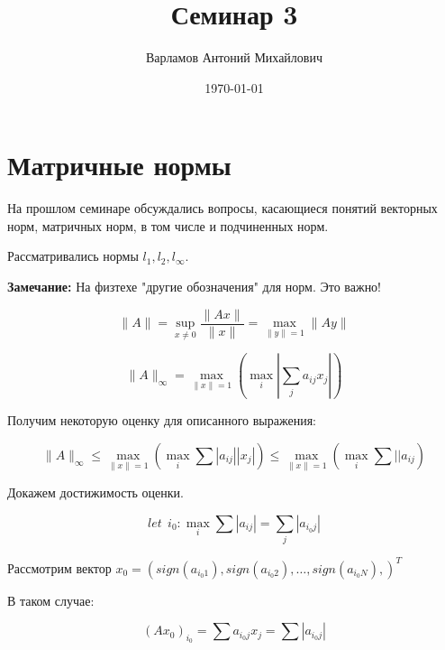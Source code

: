\documentclass[10pt,a4paper]{article}
\title{Семинар 3}
\date{\today}
\author{Варламов Антоний Михайлович}
\begin{document}
	\maketitle
	
	\section{Матричные нормы}
	
	На прошлом семинаре обсуждались вопросы, касающиеся понятий векторных норм, 
	матричных норм, в том числе и подчиненных норм.
	
	Рассматривались нормы $l_{1}, l_{2}, l_{\infty}$. 
	
	\textbf{Замечание:} На физтехе "другие обозначения" для норм. Это важно!
	
	\begin{equation}
		\parallel A \parallel = \sup\limits_{x \neq 0} 
		\frac{\parallel Ax \parallel}{\parallel x \parallel} = \max\limits_{
		\parallel y \parallel = 1} \parallel Ay \parallel
	\end{equation}
	
	\begin{equation}
		\parallel A \parallel_{\infty} = \max\limits_{\parallel x \parallel=  1}
		\left(\max\limits_{i}\left|\sum\limits_{j}a_{ij}x_{j}\right|\right)
	\end{equation}
	
	Получим некоторую оценку для описанного выражения:
	
	\begin{equation}
		\parallel A \parallel_{\infty} \leqslant \max\limits_{\parallel x 
		\parallel = 1}\left(\max\limits_{i}\sum\left|a_{ij}\right|\left|x_{j}
		\right|\right) \leqslant \max\limits_{\parallel x 
		\parallel = 1}\left(\max\limits_{i}\sum\left|\right|a_{ij}\right)
	\end{equation}
	
	Докажем достижимость оценки.
	
	\begin{equation}
		let \ \ i_{0}: \max\limits_{i}\sum\left|a_{ij}\right| = 
		\sum\limits_{j}\left|a_{i_{0}j}\right|
	\end{equation}
	
	Рассмотрим вектор $x_{0} = 
	\left(sign\left(a_{i_{0}1}\right),
	sign\left(a_{i_{0}2}\right), \ldots ,  
	sign\left(a_{i_{0}N}\right),\right)^{T}$
	
	В таком случае:
	
	\begin{equation}
		\left(Ax_{0}\right)_{i_{0}} = \sum a_{i_{0}j}x_{j} =
		\sum \left|a_{i_{0}j}\right|
	\end{equation}
	
\end{document}

